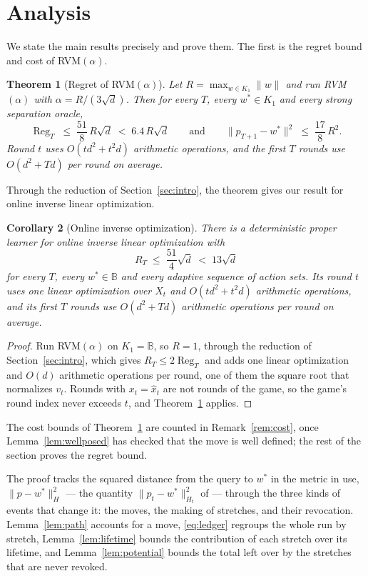 \documentclass[11pt]{article}
\theoremstyle{plain}
\newtheorem{theorem}{Theorem}[section]
\newtheorem{corollary}[theorem]{Corollary}
\theoremstyle{definition}
\theoremstyle{remark}
\DeclareMathOperator{\Reg}{Reg}
\newcommand{\Ball}{\mathbb{B}}
\newcommand{\wstar}{w^{\ast}}
\begin{document}
\section{Analysis}\label{sec:analysis}

We state the main results precisely and prove them. The first is the regret bound and cost of
RVM$(\alpha)$.

\begin{theorem}[Regret of RVM$(\alpha)$]\label{thm:rvm}
Let $R=\max_{w\in K_1}\|w\|$ and run RVM$(\alpha)$ with $\alpha=R/(3\sqrt d)$. Then for every $T$,
every $\wstar\in K_1$ and every strong separation oracle,
\[
  \Reg_T\;\le\;\frac{51}{8}\,R\sqrt d\;<\;6.4\,R\sqrt d
  \qquad\text{and}\qquad
  \|p_{T+1}-\wstar\|^{2}\;\le\;\frac{17}{8}\,R^{2} .
\]
Round $t$ uses $O(td^{2}+t^{2}d)$ arithmetic operations, and the first $T$ rounds use
$O(d^{2}+Td)$ per round on average.
\end{theorem}

Through the reduction of Section~\ref{sec:intro}, the theorem gives our result for online inverse
linear optimization.

\begin{corollary}[Online inverse optimization]\label{cor:oilo}
There is a deterministic proper learner for online inverse linear optimization with
\[
  R_T\;\le\;\frac{51}{4}\sqrt d\;<\;13\sqrt d
\]
for every $T$, every $\wstar\in\Ball$ and every adaptive sequence of action sets. Its round $t$
uses one linear optimization over $X_t$ and $O(td^{2}+t^{2}d)$ arithmetic operations, and its first
$T$ rounds use $O(d^{2}+Td)$ arithmetic operations per round on average.
\end{corollary}

\begin{proof}
Run RVM$(\alpha)$ on $K_1=\Ball$, so $R=1$, through the reduction of Section~\ref{sec:intro}, which
gives $R_T\le2\Reg_T$ and adds one linear optimization and $O(d)$ arithmetic operations per round,
one of them the square root that normalizes $v_t$. Rounds with $x_t=\hat x_t$ are not rounds of the
game, so the game's round index never exceeds $t$, and Theorem~\ref{thm:rvm} applies.
\end{proof}

The cost bounds of Theorem~\ref{thm:rvm} are counted in Remark~\ref{rem:cost}, once
Lemma~\ref{lem:wellposed} has checked that the move is well defined; the rest of the section proves
the regret bound.

The proof tracks the squared distance from the query to $\wstar$ in the metric in use,
$\|p-\wstar\|_{H}^{2}$ --- the quantity $\|p_t-\wstar\|_{H_t}^{2}$ of \cite{Cai26} --- through the
three kinds of events that change it: the moves, the making of stretches, and their revocation.
Lemma~\ref{lem:path} accounts for a move, \eqref{eq:ledger} regroups the whole run by stretch,
Lemma~\ref{lem:lifetime} bounds the contribution of each stretch over its lifetime, and
Lemma~\ref{lem:potential} bounds the total left over by the stretches that are never revoked.
\end{document}
